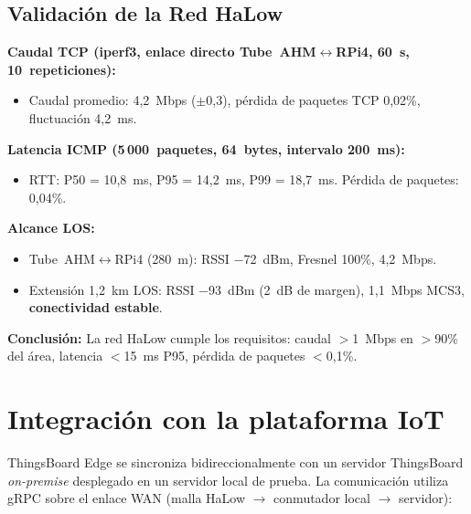 \subsection{Validación de la Red HaLow}
\label{sec:gateway-halow-validacion}

\textbf{Caudal TCP (iperf3, enlace directo Tube~AHM$\leftrightarrow$RPi4, 60~s, 10~repeticiones):}
\begin{itemize}
    \item Caudal promedio: 4,2~Mbps ($\pm$0,3), pérdida de paquetes TCP 0,02\%, fluctuación 4,2~ms.
\end{itemize}

\textbf{Latencia ICMP (5\,000~paquetes, 64~bytes, intervalo 200~ms):}
\begin{itemize}
    \item RTT: P50 = 10,8~ms, P95 = 14,2~ms, P99 = 18,7~ms.  Pérdida de paquetes: 0,04\%.
\end{itemize}

\textbf{Alcance LOS:}
\begin{itemize}
    \item Tube~AHM$\leftrightarrow$RPi4 (280~m): RSSI $-$72~dBm, Fresnel 100\%, 4,2~Mbps.
    \item Extensión 1,2~km LOS: RSSI $-$93~dBm (2~dB de margen), 1,1~Mbps MCS3, \textbf{conectividad estable}.
\end{itemize}

\textbf{Conclusión:} La red HaLow cumple los requisitos: caudal $>$1~Mbps en $>$90\% del área, latencia $<$15~ms P95, pérdida de paquetes $<$0,1\%.


\section{Integración con la plataforma IoT}
\label{sec:gateway-integracion}
\label{sec:gateway-tb-edge-onpremise}

ThingsBoard Edge se sincroniza bidireccionalmente con un servidor ThingsBoard \emph{on-premise} desplegado en un servidor local de prueba.  La comunicación utiliza gRPC sobre el enlace WAN (malla HaLow $\rightarrow$ conmutador local $\rightarrow$ servidor):

